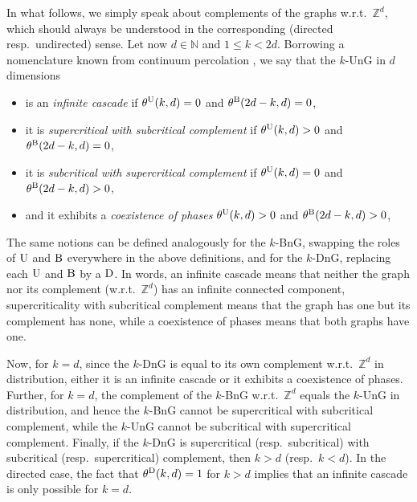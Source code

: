\documentclass[oneside]{amsart}
\newcommand{\N}{\mathbb{N}}
\theoremstyle{definition}
\newcommand{\1}{\mathbbm{1}}
\newcommand{\0}{\mathbf{o}}
\newcommand{\Z}{\mathbb{Z}}
\numberwithin{equation}{section}
\begin{document}
In what follows, we simply speak about complements of the graphs w.r.t.\ $\Z^d$, which should always be understood in the corresponding (directed resp.\ undirected) sense. Let now $d \in \N$ and $1 \leq k < 2d$. Borrowing a nomenclature known from continuum percolation \cite[Section 7.3]{MeesterRoy1996}, we say that the $k$-UnG in $d$ dimensions
\begin{itemize}
    \item is an \emph{infinite cascade} if $\theta^{\rm U}(k,d)=0$ and $\theta^{\rm B}(2d-k,d)=0$,
    \item it is \emph{supercritical with subcritical complement} if $\theta^{\rm U}(k,d)>0$ and $\theta^{\rm B}(2d-k,d)=0$, %
    \item it is \emph{subcritical with supercritical complement} if $\theta^{\rm U}(k,d)=0$ and $\theta^{\rm B}(2d-k,d)>0$,
    \item and it exhibits a \emph{coexistence of phases} $\theta^{\rm U}(k,d)>0$ and $\theta^{\rm B}(2d-k,d)>0$,
\end{itemize}
The same notions can be defined analogously for the $k$-BnG, swapping the roles of $\rm U$ and $\rm B$ everywhere in the above definitions, and for the $k$-DnG, replacing each $\rm U$ and $\rm B$ by a $\rm D$. In words, an infinite cascade means that neither the graph nor its complement (w.r.t.\ $\Z^d$) has an infinite connected component, supercriticality with subcritical complement means that the graph has one but its complement has none, while a coexistence of phases means that both graphs have one.   

Now, for $k=d$, since the $k$-DnG is equal to its own complement w.r.t.\ $\Z^d$ in distribution, either it is an infinite cascade or it exhibits a coexistence of phases. Further, for $k=d$, the complement of the $k$-BnG w.r.t.\ $\Z^d$ equals the $k$-UnG in distribution, and hence the $k$-BnG cannot be supercritical with subcritical complement, while the $k$-UnG cannot be subcritical with supercritical complement. Finally, if the $k$-DnG is supercritical (resp.\ subcritical) with subcritical (resp.\ supercritical) complement, then $k>d$ (resp.\ $k<d$). In the directed case, the fact that $\theta^{\rm D}(k,d)=1$ for $k>d$ implies that an infinite cascade is only possible for $k=d$.
\end{document}
